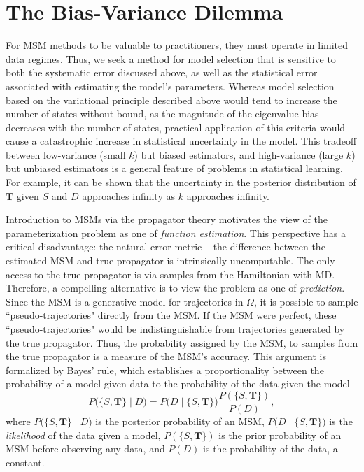 \documentclass[journal=jpcbfk, layout=traditional, manuscript=article]{achemso}
\begin{document}
\section{The Bias-Variance Dilemma}
For MSM methods to be valuable to practitioners, they must operate in limited data regimes. Thus, we seek a method for model selection that is sensitive to both the systematic error discussed above, as well as the statistical error associated with estimating the model's parameters. Whereas model selection based on the variational principle described above would tend to increase the number of states without bound, as the magnitude of the eigenvalue bias decreases with the number of states, practical application of this criteria would cause a catastrophic increase in statistical uncertainty in the model. This tradeoff between low-variance (small $k$) but biased estimators, and high-variance (large $k$) but unbiased estimators is a general feature of problems in statistical learning\cite{}. For example, it can be shown that the uncertainty in the posterior distribution of $\mathbf{T}$ given $S$ and $D$ approaches infinity as $k$ approaches infinity.

Introduction to MSMs via the propagator theory motivates the view of the parameterization problem as one of \emph{function estimation}. This perspective has a critical disadvantage: the natural error metric -- the difference between the estimated MSM and true propagator is intrinsically uncomputable. The only access to the true propagator is via samples from the Hamiltonian with MD. Therefore, a compelling alternative is to view the problem as one of \emph{prediction}. Since the MSM is a generative model for trajectories in $\Omega$, it is possible to sample ``pseudo-trajectories" directly from the MSM. If the MSM were perfect, these ``pseudo-trajectories" would be indistinguishable from trajectories generated by the true propagator. Thus, the probability assigned by the MSM, to samples from the true propagator is a measure of the MSM's accuracy. This argument is formalized by Bayes' rule, which establishes a proportionality between the probability of a model given data to the probability of the data given the model
\begin{equation}
\label{eq:bayes}
P\Big(\{S, \mathbf{T}\} \;\Big|\; D\Big) = P\Big(D \;\Big|\; \{S, \mathbf{T}\}\Big) \frac{P(\{S, \mathbf{T}\})}{P(D)},
\end{equation}
where $P\Big(\{S, \mathbf{T}\} \;\Big|\; D\Big)$ is the posterior probability of an MSM, $P\Big(D \;\Big|\; \{S, \mathbf{T}\}\Big)$ is the \emph{likelihood} of the data given a model, $P(\{S, \mathbf{T}\})$ is the prior probability of an MSM before observing any data, and $P(D)$ is the probability of the data, a constant.
\end{document}
